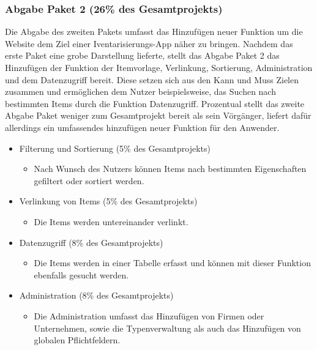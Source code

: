 \documentclass[11pt,a4paper]{report}
\begin{document}
\subsubsection{Abgabe Paket 2 (26\% des Gesamtprojekts)}
Die Abgabe des zweiten Pakets umfasst das Hinzufügen neuer Funktion um die Website dem Ziel einer Iventarisierungs-App näher zu bringen.
Nachdem das erste Paket eine grobe Darstellung lieferte, stellt das Abgabe Paket 2 das Hinzufügen der Funktion der Itemvorlage, Verlinkung, Sortierung, Administration und dem Datenzugriff bereit.
Diese setzen sich aus den Kann und Muss Zielen zusammen und ermöglichen dem Nutzer beispielsweise, das Suchen nach bestimmten Items durch die Funktion Datenzugriff.
Prozentual stellt das zweite Abgabe Paket weniger zum Gesamtprojekt bereit als sein Vörgänger, liefert dafür allerdings ein umfassendes hinzufügen neuer Funktion für den Anwender.
\begin{itemize}

\item
  Filterung und Sortierung (5\% des Gesamtprojekts)

  \begin{itemize}
  \item
    Nach Wunsch des Nutzers können Items nach bestimmten Eigenschaften gefiltert oder sortiert 			werden.
  \end{itemize}
    
\item
  Verlinkung von Items (5\% des Gesamtprojekts)

  \begin{itemize}
  \item
    Die Items werden untereinander verlinkt.
  \end{itemize}
  
\item
  Datenzugriff (8\% des Gesamtprojekts)

  \begin{itemize}
  \item
    Die Items werden in einer Tabelle erfasst und können mit dieser Funktion ebenfalls
    gesucht werden.
  \end{itemize}
  
\item
  Administration (8\% des Gesamtprojekts)

  \begin{itemize}
  \item
    Die Administration umfasst das Hinzufügen von Firmen oder
    Unternehmen, sowie die Typenverwaltung als auch das Hinzufügen von
    globalen Pflichtfeldern.
  \end{itemize}
  
\end{itemize}
\end{document}
